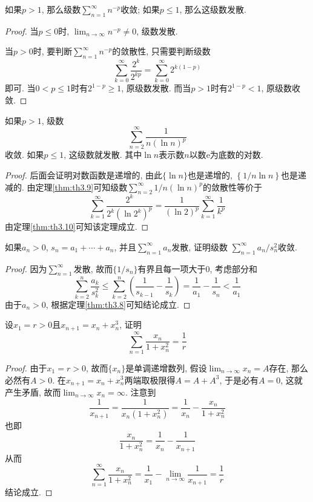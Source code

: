 \documentclass[cn,12pt,math=mtpro2,citestyle=gb7714-2015,bibstyle=gb7714-2015,twocol]{elegantbook}
\newcommand{\limn }{\lim_{n\to\infty}}
\begin{document}
\begin{theorem}\label{thm:th3.10}
  如果$p>1$, 那么级数$\sum_{n=1}^{\infty}n^{-p}$收敛; 如果$p\leq 1$, 那么这级数发散.
\end{theorem}
\begin{proof}
  当$p\leq 0$时, $\limn n^{-p}\neq0$, 级数发散.

  当$p>0$时, 要判断$\sum_{n=1}^{\infty}n^{-p}$的敛散性, 只需要判断级数
  $$\sum_{k=0}^{\infty}\frac{2^k}{2^{kp}}=\sum_{k=0}^{\infty}2^{k(1-p)}$$
  即可. 当$0<p\leq 1$时有$2^{1-p}\geq 1$, 原级数发散. 而当$p>1$时有$2^{1-p}<1$, 原级数收敛.
\end{proof}
\begin{theorem}
  如果$p>1$, 级数
  $$\sum_{n=2}^{\infty}\frac{1}{n(\ln n)^p}$$
  收敛. 如果$p\leq1$, 这级数就发散. 其中$\ln n$表示数$n$以数$\text{e}$为底数的对数.
\end{theorem}
\begin{proof}
  后面会证明对数函数是递增的, 由此$\{\ln n\}$也是递增的, $\left\{1/n\ln n\right\}$也是递减的. 由定理\ref{thm:th3.9}可知级数$\sum_ {n=2}^{\infty}1/{n(\ln n)^p}$的敛散性等价于
  $$\sum_{k=1}^{\infty}\frac{2^k}{2^k(\ln2^k)^p}=\frac{1}{(\ln2)^p}\sum_{k=1}^{\infty}\frac{1}{k^p}$$
  由定理\ref{thm:th3.10}可知该定理成立.

\end{proof}
\begin{example}
如果$a_n>0$, $s_n=a_1+\cdots+a_n$, 并且$\sum_{n=1}^{\infty}a_n$发散, 证明级数
$\sum_{n=1}^{\infty}a_n/s_n^2$收敛.
\end{example}
\begin{proof}
  因为$\sum_{n=1}^{\infty}$发散, 故而$\{1/s_n\}$有界且每一项大于0, 考虑部分和
  $$\sum_{k=2}^{n}\frac{a_k}{s_k^2}\leq \sum_{k=2}^{n}\left(\frac{1}{s_{k-1}}-\frac{1}{s_k}\right)=\frac{1}{a_1}-\frac{1}{s_n}<\frac{1}{a_1}$$
  由于$a_n>0$, 根据定理\ref{thm:th3.8}可知结论成立.
\end{proof}

\begin{example}
设$x_1=r>0$且$x_{n+1}=x_n+x_n^3$, 证明
$$\sum_{n=1}^{\infty}\frac{x_n}{1+x_n^2}=\frac{1}{r}$$
\end{example}
\begin{proof}
  由于$x_1=r>0$, 故而$\{x_n\}$是单调递增数列, 假设$\limn x_n=A$存在, 那么必然有$A>0$. 在$x_{n+1}=x_n+x_n^3$两端取极限得$A=A+A^3$, 于是必有$A=0$, 这就产生矛盾, 故而$\limn x_n=\infty$. 注意到
  $$\frac{1}{x_{n+1}}=\frac{1}{x_n(1+x_n^2)}=\frac{1}{x_n}-\frac{x_n}{1+x_n^2}$$
  也即
  $$\frac{x_n}{1+x_n^2}=\frac{1}{x_n}-\frac{1}{x_{n+1}}$$
  从而
  $$\sum_{n=1}^{\infty}\frac{x_n}{1+x_n^2}=\frac{1}{x_1}-\limn \frac{1}{x_{n+1}}=\frac{1}{r}$$
  结论成立.
\end{proof}
\newpage
\end{document}
